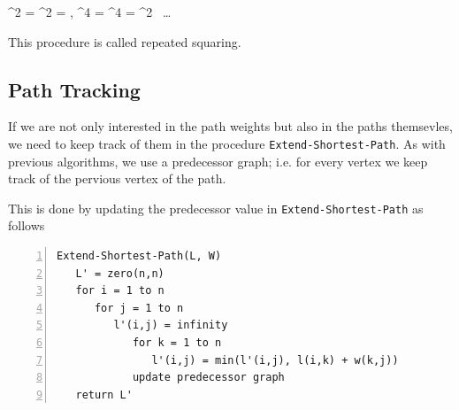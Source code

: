 \bee
\Lbf^2 = \Wbf^2 = \Wbf \cdot \Wbf, \quad \Lbf^4 = \Wbf^4 = \Wbf^2 \cdot \Wbf \, \ldots
\eee

This procedure is called repeated squaring.

\subsection{Path Tracking}

If we are not only interested in the path weights but also in the paths themsevles, we need to keep track of them in the procedure \verb|Extend-Shortest-Path|. As with previous algorithms, we use a predecessor graph; i.e. for every vertex we keep track of the pervious vertex of the path.

This is done by updating the predecessor value in \verb|Extend-Shortest-Path| as follows

\begin{Verbatim}[numbers=left, xleftmargin=5mm]
Extend-Shortest-Path(L, W)
   L' = zero(n,n)
   for i = 1 to n
      for j = 1 to n
         l'(i,j) = infinity
            for k = 1 to n
               l'(i,j) = min(l'(i,j), l(i,k) + w(k,j))
            update predecessor graph
   return L'
\end{Verbatim}




